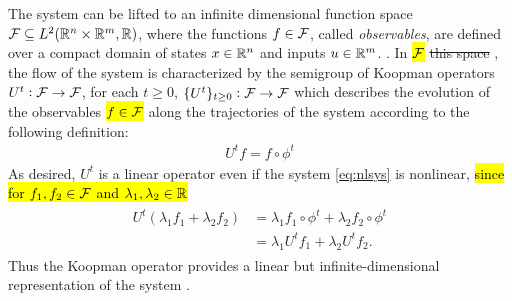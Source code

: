 The system can be lifted to an infinite dimensional function space $\mathcal{F} \subseteq L^2(\mathbb{R}^n \times \mathbb{R}^m, \mathbb{R})$, where the functions $f \in \mathcal{F}$, called \emph{observables}, are defined over a compact domain of states $x \in \mathbb{R}^n$ and inputs $u \in \mathbb{R}^m$.
.
In \hl{$\mathcal{F}$} \sout{this space} , the flow of the system is characterized by the semigroup  of Koopman operators 
$U^t : \mathcal{F} \to \mathcal{F}$, for each $t \geq 0$,
\sout{ $\{ U^t \}_{t \geq 0} : \mathcal{F} \to \mathcal{F}$ }  which describes the evolution of the observables \hl{$f \in \mathcal{F}$} along the trajectories of the system according to the following definition:
\begin{align}
    U^t f = f \circ \phi^t      
    \label{eq:koopman}
\end{align}
As desired, $U^t$ is a linear operator even if the system \eqref{eq:nlsys} is nonlinear, \hl{since for $f_1, f_2 \in \mathcal{F}$ and $\lambda_1, \lambda_2 \in \mathbb{R}$}
\begin{align}
    \begin{split}
    U^t (\lambda_1 f_1 + \lambda_2 f_2) &= \lambda_1 f_1 \circ \phi^t + \lambda_2 f_2 \circ \phi^t \\
    &= \lambda_1 U^t f_1 + \lambda_2 U^t f_2.
    \end{split}
\end{align}
Thus the Koopman operator provides a linear but infinite-dimensional representation of the system \cite{budivsic2012applied} .

